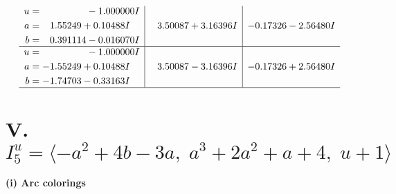 \documentclass[1p]{elsarticle_modified}
\theoremstyle{definition}
\begin{document}
$$\begin{array}{c|c|c}
\begin{aligned}
u &= \phantom{-0.000000 } -1.000000 I \\
a &= \phantom{-}1.55249 + 0.10488 I \\
b &= \phantom{-}0.391114 - 0.016070 I\end{aligned}
 & \phantom{-}3.50087 + 3.16396 I & -0.17326 - 2.56480 I \\ \hline\begin{aligned}
u &= \phantom{-0.000000 } -1.000000 I \\
a &= -1.55249 + 0.10488 I \\
b &= -1.74703 - 0.33163 I\end{aligned}
 & \phantom{-}3.50087 - 3.16396 I & -0.17326 + 2.56480 I\\
 \hline 
 \end{array}$$\newpage\newpage\renewcommand{\arraystretch}{1}
\centering \section*{V. $I^u_{5}= \langle - a^2+4 b-3 a,\;a^3+2 a^2+a+4,\;u+1 \rangle$}
\flushleft \textbf{(i) Arc colorings}\\
\end{document}
